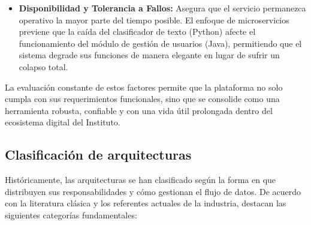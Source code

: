 \begin{itemize}
\item \textbf{Disponibilidad y Tolerancia a Fallos:} Asegura que el servicio permanezca operativo la mayor parte del tiempo posible. El enfoque de microservicios previene que la caída del clasificador de texto (Python) afecte el funcionamiento del módulo de gestión de usuarios (Java), permitiendo que el sistema degrade sus funciones de manera elegante en lugar de sufrir un colapso total.

\end{itemize}

La evaluación constante de estos factores permite que la plataforma no solo cumpla con sus requerimientos funcionales, sino que se consolide como una herramienta robusta, confiable y con una vida útil prolongada dentro del ecosistema digital del Instituto.

\subsection{Clasificación de arquitecturas}

Históricamente, las arquitecturas se han clasificado según la forma en que distribuyen sus responsabilidades y cómo gestionan el flujo de datos. De acuerdo con la literatura clásica y los referentes actuales de la industria, destacan las siguientes categorías fundamentales:

